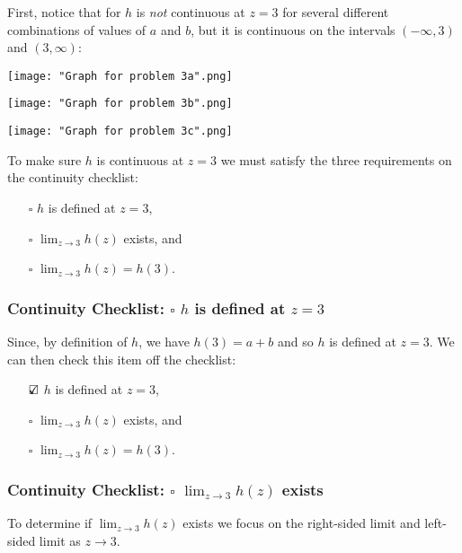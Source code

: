 \documentclass{article}
\theoremstyle{definition}
\begin{document}
\begin{Solution}
  First, notice that for $h$ is \emph{not} continuous at $z = 3$ for several different combinations of values of $a$ and $b$, but it is continuous on the intervals $(-\infty, 3)$ and $(3, \infty)$:
  \begin{center}
    \texttt{[image: "Graph for problem 3a".png]}
  \end{center}
  \begin{center}
    \texttt{[image: "Graph for problem 3b".png]}
  \end{center}
  \begin{center}
    \texttt{[image: "Graph for problem 3c".png]}
  \end{center}

  To make sure $h$ is continuous at $z = 3$ we must satisfy the three requirements on the continuity checklist:
  \begin{itemize}
    \item[$\square$]
      $h$ is defined at $z = 3$,

    \item[$\square$]
      $\lim_{z \to 3} h(z)$ exists, and

    \item[$\square$]  
      $\lim_{z \to 3} h(z) = h(3)$.
  \end{itemize}
  
  \subsubsection*{Continuity Checklist: $\square$ $h$ is defined at $z = 3$}
  Since, by definition of $h$, we have $h(3) = a + b$ and so $h$ is defined at $z = 3$.
  We can then check this item off the checklist:
  \begin{itemize}
    \item[$\text{\rlap{$\checkmark$}}\square$]
      $h$ is defined at $z = 3$,

    \item[$\square$]
      $\lim_{z \to 3} h(z)$ exists, and

    \item[$\square$]  
      $\lim_{z \to 3} h(z) = h(3)$.
  \end{itemize}

  \subsubsection*{Continuity Checklist: $\square$ $\lim_{z \to 3} h(z)$ exists}
  To determine if $\lim_{z \to 3} h(z)$ exists we focus on the right-sided limit and left-sided limit as $z \to 3$.


\end{Solution}
\end{document}
